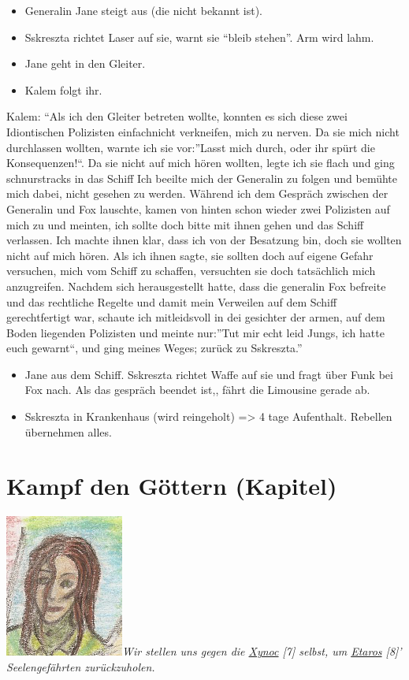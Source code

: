 \documentclass[11pt]{scrartcl}
\begin{document}
\begin{itemize}
  \begin{itemize}
  \item
    Generalin Jane steigt aus (die nicht bekannt ist).
  \item
    Sskreszta richtet Laser auf sie, warnt sie ``bleib stehen''. Arm
    wird lahm.
  \item
    Jane geht in den Gleiter.
  \item
    Kalem folgt ihr.
  \end{itemize}
\end{itemize}
Kalem: ``Als ich den Gleiter betreten wollte, konnten es sich diese zwei
Idiontischen Polizisten einfachnicht verkneifen, mich zu nerven. Da sie
mich nicht durchlassen wollten, warnte ich sie vor:''Lasst mich durch,
oder ihr spürt die Konsequenzen!``. Da sie nicht auf mich hören wollten,
legte ich sie flach und ging schnurstracks in das Schiff Ich beeilte
mich der Generalin zu folgen und bemühte mich dabei, nicht gesehen zu
werden. Während ich dem Gespräch zwischen der Generalin und Fox
lauschte, kamen von hinten schon wieder zwei Polizisten auf mich zu und
meinten, ich sollte doch bitte mit ihnen gehen und das Schiff verlassen.
Ich machte ihnen klar, dass ich von der Besatzung bin, doch sie wollten
nicht auf mich hören. Als ich ihnen sagte, sie sollten doch auf eigene
Gefahr versuchen, mich vom Schiff zu schaffen, versuchten sie doch
tatsächlich mich anzugreifen. Nachdem sich herausgestellt hatte, dass
die generalin Fox befreite und das rechtliche Regelte und damit mein
Verweilen auf dem Schiff gerechtfertigt war, schaute ich mitleidsvoll in
dei gesichter der armen, auf dem Boden liegenden Polizisten und meinte
nur:''Tut mir echt leid Jungs, ich hatte euch gewarnt``, und ging meines
Weges; zurück zu Sskreszta.''

\begin{itemize}
\item
  Jane aus dem Schiff. Sskreszta richtet Waffe auf sie und fragt über
  Funk bei Fox nach. Als das gespräch beendet ist,, fährt die Limousine
  gerade ab.
\item
  Sskreszta in Krankenhaus (wird reingeholt) =\textgreater{} 4 tage
  Aufenthalt. Rebellen übernehmen alles.
\end{itemize}
\section{Kampf den Göttern (Kapitel)}

\includegraphics{sskreszta-portrait-alt-klein.png}\emph{Wir
stellen uns gegen die
\href{http://1w6.org/deutsch/welten/raumzeit/spezies\#xynoc}{Xynoc}
{[}7{]} selbst, um
\href{http://1w6.org/deutsch/kampagnen/w-chter-der-zeit/nscs\#etaros}{Etaros}
{[}8{]}' Seelengefährten zurückzuholen.}
\end{document}
